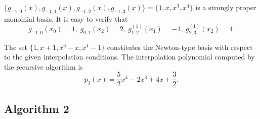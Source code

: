 \documentclass[preprint,12pt]{elsarticle}
\begin{document}
$\{g_{-1,0}(x),g_{-1,1}(x),g_{-1,2}(x),g_{-1,3}(x)\}=\{1,x,x^3,x^4\}$ is a strongly proper monomial basis. It is easy to verify that
\begin{displaymath}
g_{-1,0}(x_0)=1,\  g_{0,1}(x_2)=2,\   g_{1,2}^{(1)}(x_1)=-1,\  g_{2,3}^{(1)}(x_2)=4.
\end{displaymath}

  
The set $\{1, x+1, x^3 - x, x^4 - 1\}$ constitutes the Newton-type basis with respect to the given interpolation conditions. The interpolation polynomial computed by the recursive algorithm is
\begin{displaymath}
p_3(x)=\frac{5}{2}x^4-2x^3+4x+\frac{3}{2}.
\end{displaymath}

\subsection{Algorithm 2}
\end{document}
